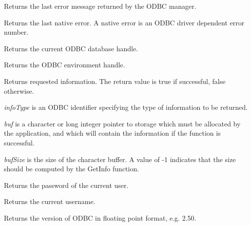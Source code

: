 
Returns the last error message returned by the ODBC manager.



Returns the last native error. A native error is an ODBC driver dependent
error number.



Returns the current ODBC database handle.



Returns the ODBC environment handle. 




Returns requested information. The return value is true if successful, false otherwise.

{\it infoType} is an ODBC identifier specifying the type of information to be returned.

{\it buf} is a character or long integer pointer to storage which must be allocated by the
application, and which will contain the information if the function is successful.

{\it bufSize} is the size of the character buffer. A value of -1 indicates that the size
should be computed by the GetInfo function.



Returns the password of the current user.



Returns the current username.



Returns the version of ODBC in floating point format, e.g. 2.50.

